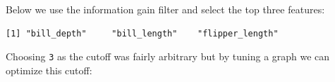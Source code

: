 Below we use the information gain filter and select the top three
features:

\begin{Shaded}
\begin{Highlighting}[]

\OtherTok{=} \NormalTok{(}\NormalTok{)}

\OtherTok{=} \NormalTok{(}\NormalTok{, } \NormalTok{(}\NormalTok{), } \NormalTok{)}
\OtherTok{=}\SpecialCharTok{\%\textgreater{}\textgreater{}\%} \NormalTok{(}\NormalTok{, }\NormalTok{(}\NormalTok{))}

\NormalTok{(}\NormalTok{, } \NormalTok{(}\NormalTok{), } \NormalTok{)}\SpecialCharTok{$}
  \NormalTok{(}\NormalTok{(task\_pen))[[}\NormalTok{]]}\SpecialCharTok{$}
\end{Highlighting}
\end{Shaded}

\begin{verbatim}
[1] "bill_depth"     "bill_length"    "flipper_length"
\end{verbatim}

Choosing \texttt{3} as the cutoff was fairly arbitrary but by tuning a
graph we can optimize this cutoff:

